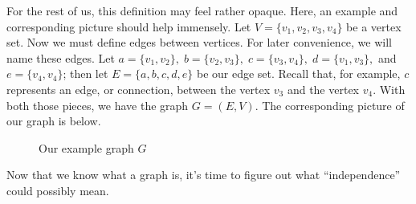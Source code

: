 \documentclass[12pt,oneside]{../../sfsuthesis}
\begin{document}
For the rest of us, this definition may feel rather opaque.
Here, an example and corresponding picture should help immensely.
Let \( V = \{ v_1, v_2, v_3, v_4 \} \) be a vertex set.
Now we must define edges between vertices.
For later convenience, we will name these edges.
Let \( a = \{ v_1, v_2 \}, \; b = \{v_2,v_3\},\; c = \{ v_3, v_4 \},\; d = \{ v_1, v_3 \}, \) and \( e = \{ v_4, v_4 \} \);
then let \( E = \{ a, b, c, d, e \} \) be our edge set.
Recall that, for example,  \( c \) represents an edge, or connection, between the vertex \( v_3 \) and the vertex \( v_4 \).
With both those pieces, we have the graph \( G = (E, V) \).
The corresponding picture of our graph is below.

\begin{figure}[H]\label{fig:simpleGraph}
    \centering

    \caption{Our example graph \( G \)}

\end{figure}

Now that we know what a graph is, it's time to figure out what ``independence'' could possibly mean.
\end{document}
